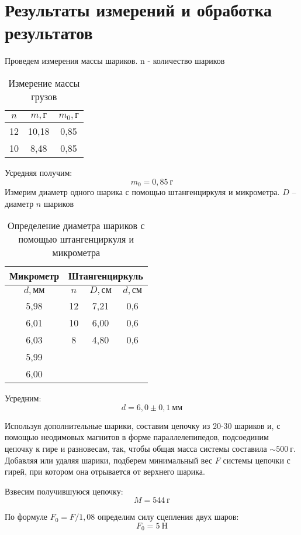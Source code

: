 \section{Результаты измерений и обработка результатов}
Проведем измерения массы шариков. n - количество шариков
\begin{table}[H]
\centering
\begin{tabular}{|c|c|c|}
\hline
$n$  & $m, \text{г}$      & $m_0, \text{г}$  \\ \hline
12 & 10,18 & 0,85 \\ \hline
10 & 8,48   & 0,85 \\ \hline
\end{tabular}
\captionsetup{justification=centering}
\caption{Измерение массы грузов}
\end{table}
Усредняя получим:
\[ m_0 = 0,85 \ \text{г}\]
Измерим диаметр одного шарика с помощью штангенциркуля и микрометра. $D$ -- диаметр $n$ шариков
\begin{table}[H]
\centering
\begin{tabular}{|c|c|c|c|}
\hline
Микрометр    & \multicolumn{3}{|c|}{Штангенциркуль} \\ \hline
$d, \text{мм}$    & $n$  & $D, \text{см}$    & $d, \text{см}$   \\ \hline
5,98 & 12 & 7,21 & 0,6 \\ \hline
6,01 & 10 & 6,00    & 0,6 \\ \hline
6,03 & 8  & 4,80  & 0,6 \\ \hline
5,99 & \multicolumn{3}{c}{} \\ \cline{1-1}
6,00    & \multicolumn{3}{c}{} \\ \cline{1-1}
\end{tabular}
\captionsetup{justification=centering}
\caption{Определение диаметра шариков с помощью штангенциркуля и микрометра}
\end{table}
Усредним:
\[d = 6,0 \pm 0,1\ \text{мм}\]

Используя дополнительные шарики, составим цепочку из 20-30 шариков и, с помощью неодимовых магнитов
в форме параллелепипедов, подсоединим цепочку к гире и разновесам, так, чтобы общая масса системы
составила $\sim 500\ \text{г}$. Добавляя или удаляя шарики, подберем минимальный вес $F$ системы цепочки с гирей, при котором она
отрывается от верхнего шарика.

Взвесим получившуюся цепочку:
\[ M = 544\ \text{г}\]

По формуле $F_0 = F/1,08$ определим силу сцепления двух шаров:
\[ F_0 = 5\ \text{H}\]

